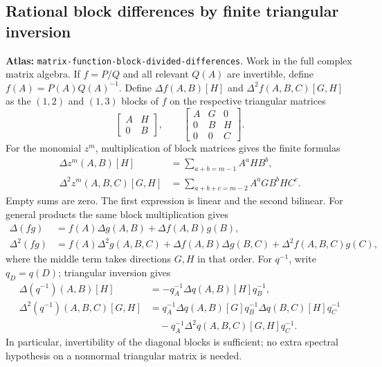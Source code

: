 \documentclass[11pt,a4paper]{article}
\DeclareRobustCommand{\code}[1]{{\footnotesize\urlstyle{tt}\nolinkurl{#1}}}
\begin{document}
\subsection{Rational block differences by finite triangular inversion}
\label{sec:matrix-function-block-divided-differences}
\textbf{Atlas:} \code{matrix-function-block-divided-differences}.
Work in the full complex matrix algebra. If $f=P/Q$ and all relevant
$Q(A)$ are invertible, define $f(A)=P(A)Q(A)^{-1}$. Define $\Delta f(A,B)[H]$
and $\Delta^2 f(A,B,C)[G,H]$ as the $(1,2)$ and $(1,3)$ blocks of $f$ on
the respective triangular matrices
\[
 \begin{bmatrix}A&H\\0&B\end{bmatrix},\qquad
 \begin{bmatrix}A&G&0\\0&B&H\\0&0&C\end{bmatrix}.
\]
For the monomial $z^m$, multiplication of block matrices gives the finite
formulas
\begin{align*}
 \Delta z^m(A,B)[H]&=\sum_{a+b=m-1}A^aHB^b,\\
 \Delta^2 z^m(A,B,C)[G,H]&=\sum_{a+b+c=m-2}A^aGB^bHC^c.
\end{align*}
Empty sums are zero. The first expression is linear and the second bilinear.
For general products the same block multiplication gives
\begin{align*}
 \Delta(fg)&=f(A)\Delta g(A,B)+\Delta f(A,B)g(B),\\
 \Delta^2(fg)&=f(A)\Delta^2g(A,B,C)
 +\Delta f(A,B)\Delta g(B,C)+\Delta^2f(A,B,C)g(C),              \tag{F16}
\end{align*}
where the middle term takes directions $G,H$ in that order. For $q^{-1}$,
write $q_D=q(D)$; triangular inversion gives
\begin{align*}
 \Delta(q^{-1})(A,B)[H]&=-q_A^{-1}\Delta q(A,B)[H]q_B^{-1},\\
 \Delta^2(q^{-1})(A,B,C)[G,H]
 &=q_A^{-1}\Delta q(A,B)[G]q_B^{-1}\Delta q(B,C)[H]q_C^{-1}\\
 &\quad-q_A^{-1}\Delta^2q(A,B,C)[G,H]q_C^{-1}.                 \tag{F17}
\end{align*}
In particular, invertibility of the diagonal blocks is sufficient; no
extra spectral hypothesis on a nonnormal triangular matrix is needed.
\end{document}
